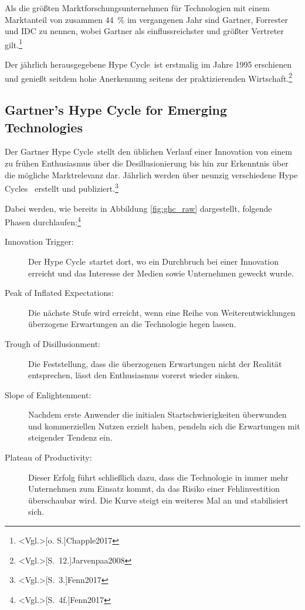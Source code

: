 Als die größten Marktforschungsunternehmen für Technologien mit einem Marktanteil von zusammen 44~\% im vergangenen Jahr sind Gartner, Forrester und \ac{IDC} zu nennen, wobei Gartner als einflussreichster und größter Vertreter gilt.\footnote{\citeNP<Vgl.>[o. S.]{Chapple2017}}

Der jährlich herausgegebene \glqq Hype Cycle\grqq~ist erstmalig im Jahre 1995 erschienen und genießt seitdem hohe Anerkennung seitens der praktizierenden Wirtschaft.\footnote{\citeNP<Vgl.>[S.~12.]{Jarvenpaa2008}}

\subsection{Gartner’s Hype Cycle for Emerging Technologies}
Der \glqq Gartner Hype Cycle\grqq~stellt den üblichen Verlauf einer Innovation von einem zu frühen Enthusiasmus über die Desillusionierung bis hin zur Erkenntnis über die mögliche Marktrelevanz dar. Jährlich werden über neunzig verschiedene \glqq Hype Cycles\grqq~ erstellt und publiziert.\footnote{\citeNP<Vgl.>[S.~3.]{Fenn2017}}

Dabei werden, wie bereits in Abbildung \ref{fig:ghc_raw} dargestellt, folgende Phasen durchlaufen:\footnote{\citeNP<Vgl.>[S.~4f.]{Fenn2017}}
\begin{description}
	\item[Innovation Trigger:] Der \glqq Hype Cycle\grqq~startet dort, wo ein Durchbruch bei einer Innovation erreicht und das Interesse der Medien sowie Unternehmen geweckt wurde.
	\item[Peak of Inflated Expectations:] Die nächste Stufe wird erreicht, wenn eine Reihe von Weiterentwicklungen überzogene Erwartungen an die Technologie hegen lassen.
	\item[Trough of Disillusionment:] Die Feststellung, dass die überzogenen Erwartungen nicht der Realität entsprechen, lässt den Enthusiasmus vorerst wieder sinken.
	\item[Slope of Enlightenment:] Nachdem erste Anwender die initialen Startschwierigkeiten überwunden und kommerziellen Nutzen erzielt haben, pendeln sich die Erwartungen mit steigender Tendenz ein.
	\item[Plateau of Productivity:] Dieser Erfolg führt schließlich dazu, dass die Technologie in immer mehr Unternehmen zum Einsatz kommt, da das Risiko einer Fehlinvestition überschaubar wird. Die Kurve steigt ein weiteres Mal an und stabilisiert sich.
\end{description}

